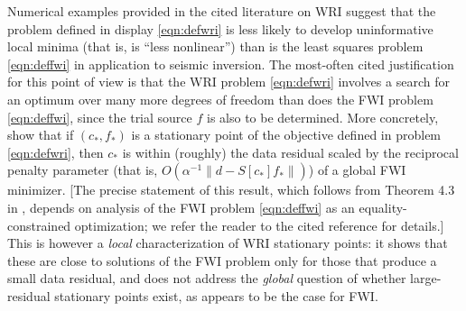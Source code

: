 Numerical examples provided in the cited literature on WRI suggest
that the problem defined in display \ref{eqn:defwri} is less likely to
develop uninformative local minima (that is, is ``less nonlinear'') than
is the least squares problem \ref{eqn:deffwi} in application to
seismic inversion. The most-often cited justification for this point
of view is that the WRI problem \ref{eqn:defwri} involves a search for an
optimum over many more degrees of freedom than does the FWI problem
\ref{eqn:deffwi}, since the trial source $f$ is also to be
determined. More concretely, \cite{LeeuwenHerrmann:16} show that if
$(c_*,f_*)$ is a
stationary point of the objective defined in problem
\ref{eqn:defwri}, then $c_*$ is within (roughly) the data residual scaled by the
reciprocal penalty parameter (that is, $O(\alpha^{-1}\|d-S[c_*]f_*\|)$) of a
global FWI minimizer. [The precise statement
of this result, which follows from Theorem 4.3 in
\cite[]{LeeuwenHerrmann:16}, depends on analysis of the FWI problem
\ref{eqn:deffwi} as an equality-constrained optimization; we refer the
reader to the cited reference for details.] This is however a {\em
  local} characterization of WRI stationary points: it shows that
these are close to solutions of the FWI problem only
for those that produce a small data residual, and does not address the {\em
  global} question of whether large-residual stationary points exist,
as appears to be the case for FWI.

